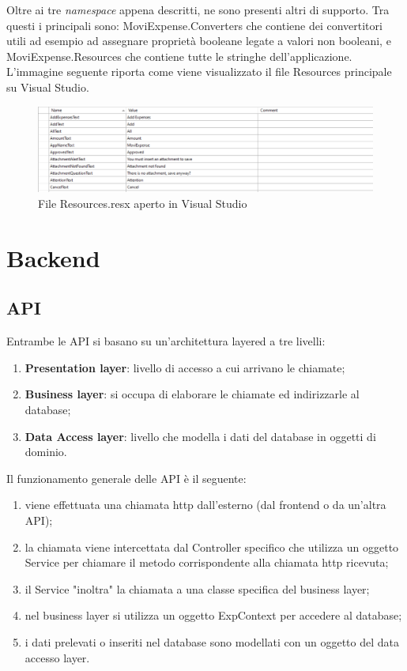 \vspace{1.5cm}

\noindent Oltre ai tre \emph{namespace} appena descritti, ne sono presenti altri di supporto. Tra questi i principali sono: MoviExpense.Converters che contiene dei convertitori utili ad esempio ad assegnare proprietà booleane legate a valori non booleani, e MoviExpense.Resources che contiene tutte le stringhe dell'applicazione. L'immagine seguente riporta come viene visualizzato il file Resources principale su Visual Studio.

\begin{figure}[H]
    \centering
    \includegraphics[width=\columnwidth]{images/resources.png}
    \caption{File Resources.resx aperto in Visual Studio}
\end{figure}



\section{Backend}

\subsection{API}

Entrambe le \gls{API} si basano su un'architettura layered a tre livelli:
\begin{enumerate}
    \item \textbf{Presentation layer}: livello di accesso a cui arrivano le chiamate;
    \item \textbf{Business layer}: si occupa di elaborare le chiamate ed indirizzarle al database;
    \item \textbf{Data Access layer}: livello che modella i dati del database in oggetti di dominio.
\end{enumerate}

\noindent Il funzionamento generale delle \gls{API} è il seguente:
\begin{enumerate}
    \item viene effettuata una chiamata http dall'esterno (dal frontend o da un'altra API);
    \item la chiamata viene intercettata dal Controller specifico che utilizza un oggetto Service per chiamare il metodo corrispondente alla chiamata http ricevuta;
    \item il Service "inoltra" la chiamata a una classe specifica del business layer;
    \item nel business layer si utilizza un oggetto ExpContext per accedere al database;
    \item i dati prelevati o inseriti nel database sono modellati con un oggetto del data accesso layer.
\end{enumerate}

